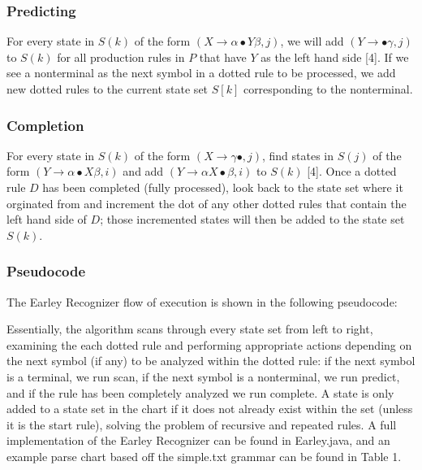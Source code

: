 \documentclass[a4paper, 11pt]{article}
\begin{document}
\subsubsection{Predicting}
For every state in $S(k)$ of the form $(X \to \alpha \bullet Y \beta, j)$, we will add $(Y \to \bullet \gamma, j)$ to $S(k)$ for all production rules in $P$ that have $Y$ 
as the left hand side [4]. If we see a nonterminal as the next symbol in a dotted rule to be processed, we add new dotted rules to the current state set $S[k]$ corresponding
to the nonterminal.

\subsubsection{Completion}
For every state in $S(k)$ of the form $(X \to \gamma \bullet, j)$, find states in $S(j)$ of the form $(Y \to \alpha \bullet X \beta, i)$ and add
$(Y \to \alpha X \bullet \beta, i)$ to $S(k)$ [4]. Once a dotted rule $D$ has been completed (fully processed), look back to the state set where it orginated from and increment
the dot of any other dotted rules that contain the left hand side of $D$; those incremented states will then be added to the state set $S(k)$.

\subsubsection{Pseudocode}
The Earley Recognizer flow of execution is shown in the following pseudocode:
\begin{center}
\end{center}

Essentially, the algorithm scans through every state set from left to right, examining the each dotted rule and performing appropriate actions depending on the next symbol (if
any) to be analyzed within the dotted rule: if the next symbol is a terminal, we run scan, if the next symbol is a nonterminal, we run predict, and if the rule has been
completely analyzed we run complete. A state is only added to a state set in the chart if it does not already exist within the set (unless it is the start rule), 
solving the problem of recursive and repeated rules. 
A full implementation of the Earley Recognizer can be found in Earley.java, and an example parse chart based off the simple.txt grammar can be found in Table 1.
\end{document}
